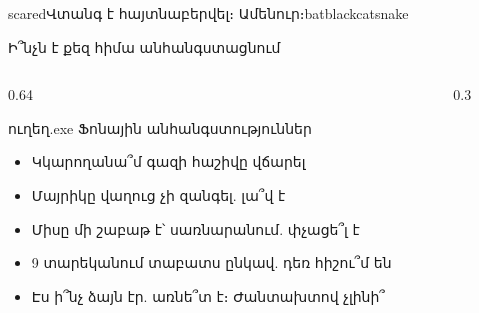 
%
  {    }%
  {scared}{Վտանգ է հայտնաբերվել։ Ամենուր։}{{bat}{blackcat}{snake}}

\begin{frame}{Ի՞նչն է քեզ հիմա անհանգստացնում}
  \begin{columns}[c]
    \begin{column}{0.64\textwidth}
      \begin{popup}{ուղեղ.exe}
        {\blackfont Ֆոնային անհանգստություններ}
        \begin{itemize}
          \item<2-> Կկարողանա՞մ գազի հաշիվը վճարել
          \item<3-> Մայրիկը վաղուց չի զանգել. լա՞վ է
          \item<4-> Միսը մի շաբաթ է՝ սառնարանում. փչացե՞լ է
          \item<5-> 9 տարեկանում տաբատս ընկավ. դեռ հիշու՞մ են
          \item<6-> Էս ի՞նչ ձայն էր. առնե՞տ է։ Ժանտախտով չլինի՞
        \end{itemize}
        \vspace{-1mm}
      \end{popup}
    \end{column}
    \begin{column}{0.3\textwidth}
      \centering
      \par\medskip
    \end{column}
  \end{columns}
\end{frame}

